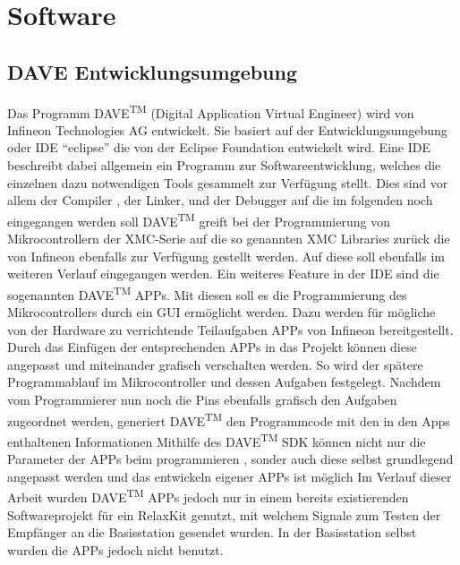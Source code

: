 \chapter{Software}
\label{sec:Software}
\pagestyle{scrheadings}
\section{DAVE Entwicklungsumgebung}

Das Programm DAVE\textsuperscript{TM} (Digital Application Virtual Engineer) wird von Infineon Technologies AG entwickelt. Sie basiert auf der Entwicklungsumgebung oder \ac{IDE} \enquote{eclipse} die von der Eclipse Foundation entwickelt wird. Eine \ac{IDE} beschreibt dabei allgemein ein Programm zur Softwareentwicklung, welches die einzelnen dazu notwendigen Tools gesammelt zur Verfügung stellt. Dies sind vor allem der Compiler , der Linker, und der Debugger auf die im folgenden noch eingegangen werden soll %
DAVE\textsuperscript{TM} greift bei der Programmierung von Mikrocontrollern der XMC-Serie auf die so genannten XMC Libraries zurück die von Infineon ebenfalls zur Verfügung gestellt werden.  Auf diese soll ebenfalls im weiteren Verlauf  eingegangen werden. Ein weiteres Feature in der \ac{IDE} sind die sogenannten DAVE\textsuperscript{TM} APPs. Mit diesen soll es die Programmierung des Mikrocontrollers durch ein \ac{GUI} ermöglicht werden. Dazu werden für  mögliche von der Hardware zu verrichtende Teilaufgaben APPs von Infineon bereitgestellt. Durch das Einfügen der entsprechenden APPs in das Projekt können diese angepasst und miteinander grafisch verschalten werden. So wird der spätere Programmablauf im Mikrocontroller und dessen Aufgaben festgelegt. Nachdem vom Programmierer nun noch die Pins ebenfalls grafisch den Aufgaben zugeordnet werden, generiert  DAVE\textsuperscript{TM}  den Programmcode mit den in den Apps enthaltenen Informationen%
Mithilfe des DAVE\textsuperscript{TM} \ac{SDK} können nicht nur die Parameter der APPs beim programmieren , sonder auch diese selbst grundlegend angepasst werden und das entwickeln eigener APPs ist möglich%
Im Verlauf dieser Arbeit wurden DAVE\textsuperscript{TM}  APPs jedoch nur in einem bereits existierenden Softwareprojekt für ein RelaxKit genutzt, mit welchem  Signale zum Testen der Empfänger an die Basisstation gesendet wurden. In der Basisstation selbst wurden die APPs jedoch nicht benutzt.


